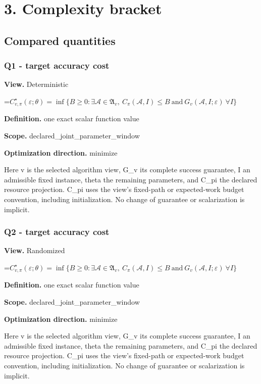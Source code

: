 \documentclass[10pt,a4paper]{article}
\newcommand{\AtlasMath}[1]{\par\begingroup\centering\setbox0=\hbox{$\displaystyle #1$}\ifdim\wd0>1.4\linewidth\typeout{ATLAS WIDE FORMULA: \the\wd0}\fi\ifdim\wd0>\linewidth\resizebox{\linewidth}{!}{\box0}\else\box0\fi\par\endgroup}
\begin{document}
\section{3. Complexity bracket}
\subsection{Compared quantities}
\subsubsection{Q1 - target accuracy cost}
\textbf{View.} Deterministic

\AtlasMath{C^\star_{v,\pi}(\varepsilon;\theta)=\inf\{B\ge0:\exists\mathcal A\in\mathfrak A_v,\ C_\pi(\mathcal A,I)\le B\ \text{and}\ G_v(\mathcal A,I;\varepsilon)\ \forall I\}}
\textbf{Definition.} one exact scalar function value

\textbf{Scope.} declared\_joint\_parameter\_window

\textbf{Optimization direction.} minimize

Here v is the selected algorithm view, G\_v its complete success guarantee, I an admissible fixed instance, theta the remaining parameters, and C\_pi the declared resource projection. C\_pi uses the view's fixed-path or expected-work budget convention, including initialization. No change of guarantee or scalarization is implicit.

\subsubsection{Q2 - target accuracy cost}
\textbf{View.} Randomized

\AtlasMath{C^\star_{v,\pi}(\varepsilon;\theta)=\inf\{B\ge0:\exists\mathcal A\in\mathfrak A_v,\ C_\pi(\mathcal A,I)\le B\ \text{and}\ G_v(\mathcal A,I;\varepsilon)\ \forall I\}}
\textbf{Definition.} one exact scalar function value

\textbf{Scope.} declared\_joint\_parameter\_window

\textbf{Optimization direction.} minimize

Here v is the selected algorithm view, G\_v its complete success guarantee, I an admissible fixed instance, theta the remaining parameters, and C\_pi the declared resource projection. C\_pi uses the view's fixed-path or expected-work budget convention, including initialization. No change of guarantee or scalarization is implicit.
\end{document}
